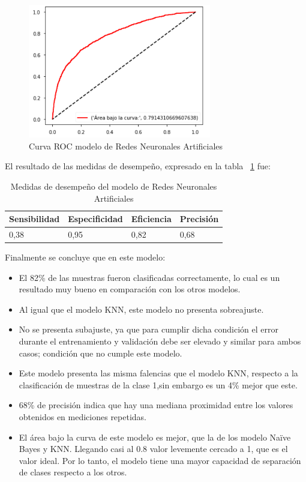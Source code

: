 \documentclass[conference]{IEEEtran}
\begin{document}
\begin{center}
    \begin{figure}[h]
        \hfill
     \centerline{\includegraphics[width=8cm]{ROCGNA.png}}
    \caption{Curva ROC modelo de Redes Neuronales Artificiales }
    \label{fig:rocRNA}
    \end{figure}  
\end{center}
El resultado de las medidas de desempeño, expresado en la tabla ~\ref{tab:medidasRNA} fue:
\newline
\begin{table}[H]
\centering
\begin{tabular}{|l|l|l|l|}
\hline
Sensibilidad & Especificidad & \multicolumn{1}{r|}{Eficiencia} & Precisión \\ \hline
0,38         & 0,95          & 0,82                            & 0,68      \\ \hline
\end{tabular}
\caption{Medidas de desempeño del modelo de Redes Neuronales Artificiales}
\label{tab:medidasRNA}
\end{table}
Finalmente se concluye que en este modelo:
\begin{itemize}
\item El 82\% de las muestras fueron clasificadas correctamente, lo cual es un resultado muy bueno en comparación con los otros modelos.
\item Al igual que el modelo KNN, este modelo no presenta sobreajuste. 
\item No se presenta subajuste, ya que para cumplir dicha condición el error durante el entrenamiento y validación debe ser elevado y similar para ambos casos; condición que no cumple este modelo.
\item Este modelo presenta las misma falencias que el modelo KNN, respecto a la clasificación de muestras de la clase 1,sin embargo es un 4\% mejor que este.
\item 68\% de precisión indica que hay una mediana proximidad entre los valores obtenidos en mediciones repetidas.
\item El área bajo la curva de este modelo es mejor, que la de los modelo Naïve Bayes y KNN. Llegando casi al 0.8 valor levemente cercado a 1, que es el valor ideal. Por lo tanto, el modelo  tiene una mayor capacidad de separación de clases respecto a los otros.
\end{itemize}
\end{document}
